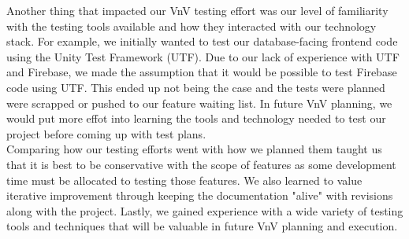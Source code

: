\documentclass[12pt, titlepage]{article}
\begin{document}
Another thing that impacted our VnV testing effort was our level of familiarity with the testing tools available and how they interacted with our technology stack.
For example, we initially wanted to test our database-facing frontend code using the Unity Test Framework (UTF). Due to our lack of experience with UTF and Firebase, we made the assumption that
it would be possible to test Firebase code using UTF. This ended up not being the case and the tests were planned were scrapped or pushed to our feature waiting list. In future VnV planning, we would
put more effot into learning the tools and technology needed to test our project before coming up with test plans.\\

Comparing how our testing efforts went with how we planned them taught us that it is best to be conservative with the scope of features as some development time must
be allocated to testing those features. We also learned to value iterative improvement through keeping the documentation "alive" with revisions along with the project.
Lastly, we gained experience with a wide variety of testing tools and techniques that will be valuable in future VnV planning and execution.
\end{document}
